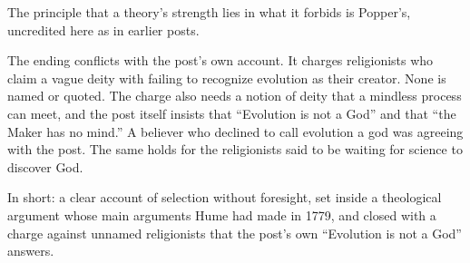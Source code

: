 \begin{afterword}
The principle that a theory's strength lies in what it forbids is Popper's, uncredited here as in earlier posts.

The ending conflicts with the post's own account. It charges religionists who claim a vague deity with failing to recognize evolution as their creator. None is named or quoted. The charge also needs a notion of deity that a mindless process can meet, and the post itself insists that ``Evolution is not a God'' and that ``the Maker has no mind.'' A believer who declined to call evolution a god was agreeing with the post. The same holds for the religionists said to be waiting for science to discover God.

In short: a clear account of selection without foresight, set inside a theological argument whose main arguments Hume had made in 1779, and closed with a charge against unnamed religionists that the post's own ``Evolution is not a God'' answers.
\end{afterword}
